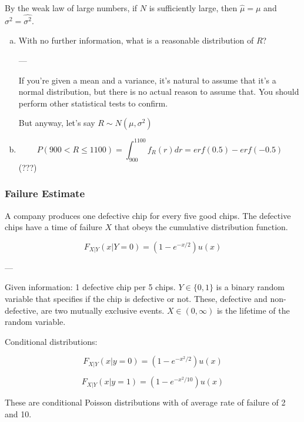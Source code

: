 \documentclass{report}
\newcommand{\var}{\sigma^2}
\begin{document}
By the weak law of large numbers, if $N$ is sufficiently large, then $\hat{\mu} = \mu$ and $\sigma^2 = \hat{\sigma^2}$.

\begin{enumerate}[(a)]
\item With no further information, what is a reasonable distribution of $R$?

---

If you're given a mean and a variance, it's natural to assume that it's a normal distribution, but there is no actual reason to assume that. You should perform other statistical tests to confirm.

But anyway, let's say $R \sim N(\mu, \var)$


\item 

$$P(900 < R \leq 1100) = \int_{900}^{1100} f_R(r) dr = erf(0.5) - erf(-0.5)$$ (???)

\end{enumerate}

\subsubsection{Failure Estimate}

A company produces one defective chip for every five good chips. The defective chips have a time of failure $X$ that obeys the cumulative distribution function.

$$F_{X|Y} (x|Y = 0) = (1-e^{-x/2})u(x)$$

---

Given information: 1 defective chip per 5 chips. $Y \in \{0,1\}$ is a binary random variable that specifies if the chip is defective or not. These, defective and non-defective, are two mutually exclusive events. $X \in (0, \infty)$ is the lifetime of the random variable.

Conditional distributions:

$$F_{X|Y}(x|y = 0) = (1 -e ^{-x^2/2}) u(x) $$

$$F_{X|Y}(x|y = 1) = (1 -e ^{-x^2/10}) u(x) $$

These are conditional Poisson distributions with of average rate of failure of 2 and 10.
\end{document}
